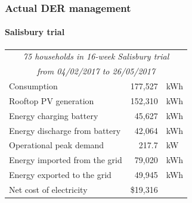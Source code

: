 \documentclass[presentation, smaller, xcolor=table]{beamer}
\begin{document}
\begin{frame}
	\frametitle{Actual DER management}
	\framesubtitle{Salisbury trial}

	\begin{table}
	\centering
	\begin{tabular}{l r @{ } l}
		\toprule
		\multicolumn{3}{c}{\textit{75 households in 16-week Salisbury trial}}	\\
		\multicolumn{3}{c}{\textit{from 04/02/2017 to 26/05/2017}}	\\
		\midrule
		Consumption				& 177,527&kWh	\\
		Rooftop PV generation 		& 152,310&kWh	\\
		Energy charging battery		& 45,627&kWh		\\
		Energy discharge from battery	& 42,064&kWh		\\
		Operational peak demand		& 217.7&kW		\\
		Energy imported from the grid	& 79,020&kWh		\\
		Energy exported to the grid	& 49,945&kWh		\\
		Net cost of electricity			& \$19,316&		\\
		\bottomrule
	\end{tabular}
	\end{table}

\end{frame}
\end{document}
